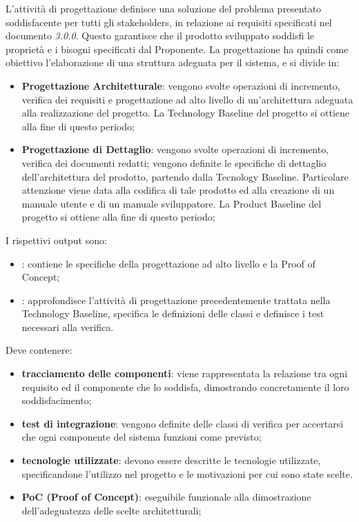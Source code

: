         L'attività di progettazione definisce una soluzione del problema presentato soddisfacente per tutti gli stakeholders, in relazione ai requisiti specificati nel documento \AdR{} \textit{3.0.0}. Questo garantisce che il prodotto sviluppato soddisfi le proprietà e i bisogni specificati dal Proponente.
        La progettazione ha quindi come obiettivo l'elaborazione di una struttura adeguata per il sistema, e si divide in:
        \begin{itemize}
        	\item{\textbf{Progettazione Architetturale}}: vengono svolte operazioni di incremento, verifica dei requisiti e progettazione ad alto livello di un'architettura adeguata alla realizzazione del progetto. La Technology Baseline del progetto si ottiene alla fine di questo periodo;
        	\item{\textbf{Progettazione di Dettaglio}}: vengono svolte operazioni di incremento, verifica dei documenti redatti; vengono definite le specifiche di dettaglio dell'architettura del prodotto, partendo dalla Tecnology Baseline. Particolare attenzione viene data alla codifica di tale prodotto ed alla creazione di un manuale utente e di un manuale sviluppatore. La Product Baseline del progetto si ottiene alla fine di questo periodo;
        \end{itemize}
    	I rispettivi output sono:
        \begin{itemize}
           	\item{\textbf{\TB{}}: contiene le specifiche della progettazione ad alto livello e la Proof of Concept;}
			\item{\textbf{\PB{}}: approfondisce l'attività di progettazione precedentemente trattata nella Technology Baseline, specifica le definizioni delle classi e definisce i test necessari alla verifica.}
   		\end{itemize}

  Deve contenere:
  \begin{itemize}
		\item \textbf{tracciamento delle componenti}: viene rappresentata la relazione tra ogni requisito ed il componente che lo soddisfa, dimostrando concretamente il loro soddisfacimento;
		\item \textbf{test di integrazione}: vengono definite delle classi di verifica per accertarsi che ogni componente del sistema funzioni come previsto;
		\item \textbf{tecnologie utilizzate}: devono essere descritte le tecnologie utilizzate, specificandone l'utilizzo nel progetto e le motivazioni per cui sono state scelte.
		\item \textbf{PoC (Proof of Concept)}: eseguibile funzionale alla dimostrazione dell'adeguatezza delle scelte architetturali;
  \end{itemize}

